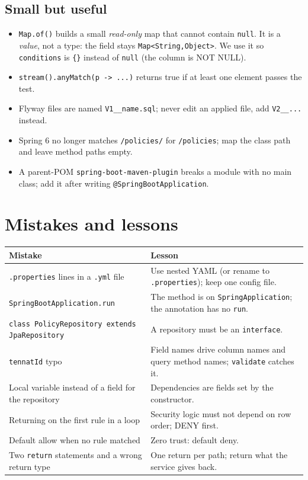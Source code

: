 \documentclass[11pt,a4paper]{article}
\newcommand{\code}[1]{\texttt{\small #1}}
\begin{document}
\subsection{Small but useful}
\begin{itemize}
  \item \code{Map.of()} builds a small \emph{read-only} map that cannot contain \code{null}. It is a \emph{value}, not a type: the field stays \code{Map<String,Object>}. We use it so \code{conditions} is \code{\{\}} instead of \code{null} (the column is NOT NULL).
  \item \code{stream().anyMatch(p -> ...)} returns true if at least one element passes the test.
  \item Flyway files are named \code{V1\_\_name.sql}; never edit an applied file, add \code{V2\_\_...} instead.
  \item Spring 6 no longer matches \code{/policies/} for \code{/policies}; map the class path and leave method paths empty.
  \item A parent-POM \code{spring-boot-maven-plugin} breaks a module with no main class; add it after writing \code{@SpringBootApplication}.
\end{itemize}

\section{Mistakes and lessons}

\begin{tabular}{@{}p{6.2cm}p{8.8cm}@{}}
\toprule
\textbf{Mistake} & \textbf{Lesson} \\
\midrule
\code{.properties} lines in a \code{.yml} file & Use nested YAML (or rename to \code{.properties}); keep one config file. \\
\code{SpringBootApplication.run} & The method is on \code{SpringApplication}; the annotation has no \code{run}. \\
\code{class PolicyRepository extends JpaRepository} & A repository must be an \code{interface}. \\
\code{tennatId} typo & Field names drive column names and query method names; \code{validate} catches it. \\
Local variable instead of a field for the repository & Dependencies are fields set by the constructor. \\
Returning on the first rule in a loop & Security logic must not depend on row order; DENY first. \\
Default allow when no rule matched & Zero trust: default deny. \\
Two \code{return} statements and a wrong return type & One return per path; return what the service gives back. \\
\bottomrule
\end{tabular}
\end{document}
